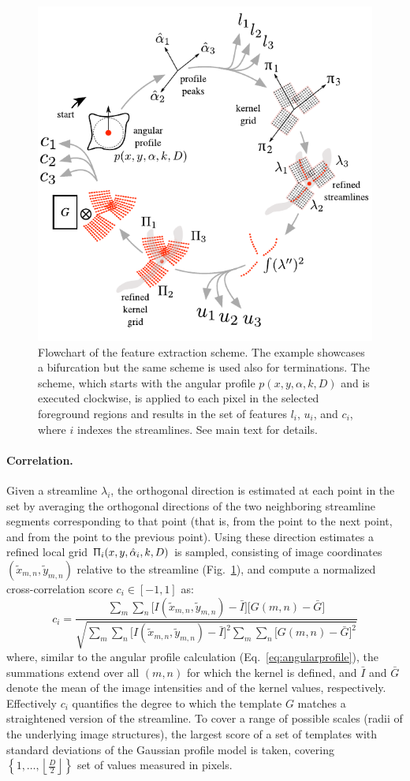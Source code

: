 \begin{figure}[!t]
	\centering
	\includegraphics[width=0.5\columnwidth]{fig4}
	\caption{Flowchart of the feature extraction scheme. The example showcases a bifurcation but the same scheme is used also for terminations. The scheme, which starts with the angular profile $p(x,y,\alpha,k,D)$ and is executed clockwise, is applied to each pixel in the selected foreground regions and results in the set of features $l_i$, $u_i$, and $c_i$, where $i$ indexes the streamlines. See main text for details.}
	\label{fig4}
\end{figure}

\paragraph{Correlation.} Given a streamline $\lambda_{i}$, the orthogonal direction is estimated at each point in the set by averaging the orthogonal directions of the two neighboring streamline segments corresponding to that point (that is, from the point to the next point, and from the point to the previous point). Using these direction estimates a refined local grid $\Uppi_{i}(x,y,\hat{\alpha}_{i},k,D)$ is sampled, consisting of image coordinates $(\tilde{x}_{m,n},\tilde{y}_{m,n})$ relative to the streamline (Fig.~\ref{fig4}), and compute a normalized cross-correlation \cite{lewis1995fast} score $c_{i}\in[-1,1]$ as:
\begin{equation} 
\label{eq:correlation}
c_{i} = \frac{\sum_{m}\sum_{n} \bigl[I(\tilde{x}_{m,n},\tilde{y}_{m,n})-\bar{I}\bigr] \bigl[G(m,n)-\bar{G}\bigr]}{\sqrt{\sum_{m}\sum_{n}\bigl[I(\tilde{x}_{m,n},\tilde{y}_{m,n})-\bar{I}\bigr]^{2}\sum_{m}\sum_{n}\bigl[G(m,n)-\bar{G}\bigr]^{2}}}
\end{equation}
where, similar to the angular profile calculation (Eq.~\ref{eq:angularprofile}), the summations extend over all $(m,n)$ for which the kernel is defined, and $\bar{I}$ and $\bar{G}$ denote the mean of the image intensities and of the kernel values, respectively. Effectively $c_{i}$ quantifies the degree to which the template $G$ matches a straightened version of the streamline. To cover a range of possible scales (radii of the underlying image structures), the largest score of a set of templates with standard deviations of the Gaussian profile model \cite{su2012junction} is taken, covering $\left\lbrace 1,\dots,\left\lfloor{\frac{D}{2}}\right\rfloor\right\rbrace $ set of values measured in pixels.

